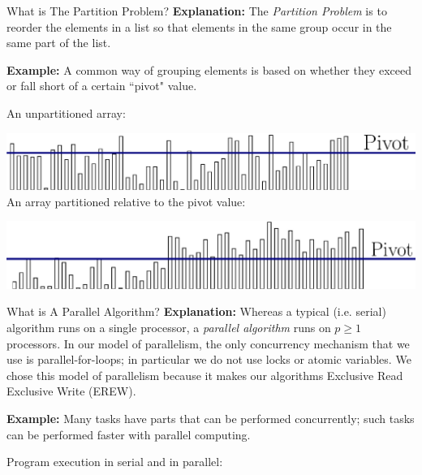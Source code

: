 \documentclass[table,serif,mathserif,final]{beamer}
\theoremstyle{remark}
\begin{document}
\begin{frame}
\begin{block}{\Huge What is The Partition Problem?}
  \justifying
  \Huge
  \textbf{Explanation:} The \emph{Partition Problem} is to reorder the elements in a list so that elements in the same group occur in the same part of the list.

  \textbf{Example:} A common way of grouping elements is based on whether they exceed or fall short of a certain ``pivot" value.

  {\color{blue} An unpartitioned array:}

  \includegraphics[width=\linewidth]{imgs/partitionDefn/partitionDefn1Ann.eps}
  {\color{blue} An array partitioned relative to the pivot value:}

  \includegraphics[width=\linewidth]{imgs/partitionDefn/partitionDefn2Ann.eps}
\end{block}
\vspace{1cm}

\begin{block}{\Huge What is A Parallel Algorithm?}
  \justifying
  \Huge
  \textbf{Explanation:} Whereas a typical (i.e. serial) algorithm runs on a single processor, a \emph{parallel algorithm} runs on $p \geq 1$ processors. In our model of parallelism, the only concurrency mechanism that we use is parallel-for-loops; in particular we do not use locks or atomic variables. We chose this model of parallelism because it makes our algorithms Exclusive Read Exclusive Write (EREW).

  \textbf{Example:} Many tasks have parts that can be performed concurrently; such tasks can be performed faster with parallel computing.

  {\color{blue} Program execution in serial and in parallel: }


\end{block}
\end{frame}
\end{document}
